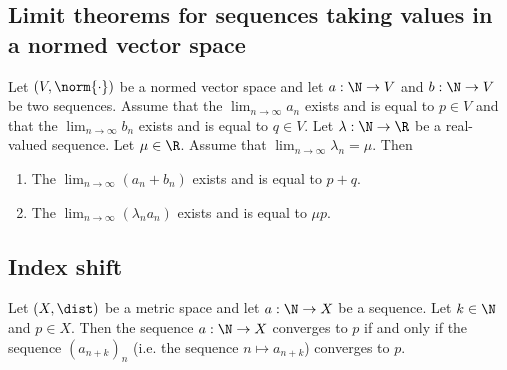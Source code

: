 \subsection{Limit theorems for sequences taking values in a normed vector space}
\begin{theorem}
    Let $(V, \norm{\cdot})$ be a normed vector space and let $a: \N \to V$ and $b: \N \to V$ be two sequences. Assume that the $\lim_{n\to\infty}a_n$ exists and is equal to $p \in V$
    and that the $\lim_{n\to\infty}b_n$ exists and is equal to $q \in V$. Let $\lambda: \N \to \R$ be a real-valued sequence. Let $\mu \in \R$.
    Assume that $\lim_{n\to\infty}\lambda_n = \mu$. Then
    \begin{enumerate}
        \item The $\lim_{n\to\infty}(a_n + b_n)$ exists and is equal to $p + q$.
        \item The $\lim_{n\to\infty}(\lambda_n a_n)$ exists and is equal to $\mu p$.
    \end{enumerate}
\end{theorem}

\subsection{Index shift}
\begin{proposition}
    Let $(X, \dist)$ be a metric space and let $a: \N \to X$ be a sequence. Let $k \in \N$ and $p \in X$. Then the sequence $a: \N \to X$ converges to $p$ if and only if the sequence
    $(a_{n+k})_n$ (i.e. the sequence $n \mapsto a_{n+k}$) converges to $p$.
\end{proposition}
